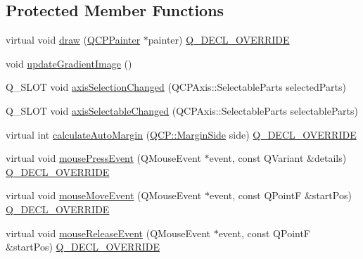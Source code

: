 \subsection*{Protected Member Functions}
\begin{DoxyCompactItemize}
\item 
virtual void \mbox{\hyperlink{class_q_c_p_color_scale_axis_rect_private_a52a21c7cbe086cd587c955cfe6e25e3b}{draw}} (\mbox{\hyperlink{class_q_c_p_painter}{Q\+C\+P\+Painter}} $\ast$painter) \mbox{\hyperlink{qcustomplot_8h_a42cc5eaeb25b85f8b52d2a4b94c56f55}{Q\+\_\+\+D\+E\+C\+L\+\_\+\+O\+V\+E\+R\+R\+I\+DE}}
\item 
void \mbox{\hyperlink{class_q_c_p_color_scale_axis_rect_private_a73754cab312aeaddea1bfcc67cc079ac}{update\+Gradient\+Image}} ()
\item 
Q\+\_\+\+S\+L\+OT void \mbox{\hyperlink{class_q_c_p_color_scale_axis_rect_private_a6112ad4291ac1695d37659cb049d598d}{axis\+Selection\+Changed}} (Q\+C\+P\+Axis\+::\+Selectable\+Parts selected\+Parts)
\item 
Q\+\_\+\+S\+L\+OT void \mbox{\hyperlink{class_q_c_p_color_scale_axis_rect_private_a66d2baed86966bb03a6d7c32dc7d59f7}{axis\+Selectable\+Changed}} (Q\+C\+P\+Axis\+::\+Selectable\+Parts selectable\+Parts)
\item 
virtual int \mbox{\hyperlink{class_q_c_p_color_scale_axis_rect_private_ac51055d83f5f414b6d013d3a24b0a941}{calculate\+Auto\+Margin}} (\mbox{\hyperlink{namespace_q_c_p_a7e487e3e2ccb62ab7771065bab7cae54}{Q\+C\+P\+::\+Margin\+Side}} side) \mbox{\hyperlink{qcustomplot_8h_a42cc5eaeb25b85f8b52d2a4b94c56f55}{Q\+\_\+\+D\+E\+C\+L\+\_\+\+O\+V\+E\+R\+R\+I\+DE}}
\item 
virtual void \mbox{\hyperlink{class_q_c_p_color_scale_axis_rect_private_aa9a7c807eaa4666870ac94aa6abc4dde}{mouse\+Press\+Event}} (Q\+Mouse\+Event $\ast$event, const Q\+Variant \&details) \mbox{\hyperlink{qcustomplot_8h_a42cc5eaeb25b85f8b52d2a4b94c56f55}{Q\+\_\+\+D\+E\+C\+L\+\_\+\+O\+V\+E\+R\+R\+I\+DE}}
\item 
virtual void \mbox{\hyperlink{class_q_c_p_color_scale_axis_rect_private_a9cd27ad8c5cfb49aefd9dbb30def4beb}{mouse\+Move\+Event}} (Q\+Mouse\+Event $\ast$event, const Q\+PointF \&start\+Pos) \mbox{\hyperlink{qcustomplot_8h_a42cc5eaeb25b85f8b52d2a4b94c56f55}{Q\+\_\+\+D\+E\+C\+L\+\_\+\+O\+V\+E\+R\+R\+I\+DE}}
\item 
virtual void \mbox{\hyperlink{class_q_c_p_color_scale_axis_rect_private_a6c89b988d3a0b93c0878f0ebdb5037f4}{mouse\+Release\+Event}} (Q\+Mouse\+Event $\ast$event, const Q\+PointF \&start\+Pos) \mbox{\hyperlink{qcustomplot_8h_a42cc5eaeb25b85f8b52d2a4b94c56f55}{Q\+\_\+\+D\+E\+C\+L\+\_\+\+O\+V\+E\+R\+R\+I\+DE}}

\end{DoxyCompactItemize}
